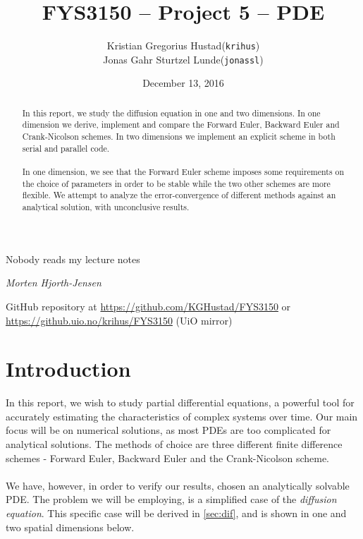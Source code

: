 \documentclass[10pt,a4paper]{article}
\begin{document}
\title{FYS3150 -- Project 5 -- PDE}
\author{
	\begin{tabular}{rl}
        Kristian Gregorius Hustad & (\texttt{krihus})\\
        Jonas Gahr Sturtzel Lunde & (\texttt{jonassl})
	\end{tabular}}
\date{December 13, 2016}
\maketitle



\setlength{\epigraphwidth}{0.75\textwidth}
\renewcommand{\epigraphflush}{center}
\renewcommand{\beforeepigraphskip}{50pt}
\renewcommand{\afterepigraphskip}{100pt}
\renewcommand{\epigraphsize}{\normalsize}
\epigraph{Nobody reads my lecture notes}
	{\textit{Morten Hjorth-Jensen}}

\begin{abstract}
\noindent
In this report, we study the diffusion equation in one and two dimensions. In one dimension we derive, implement and compare the Forward Euler, Backward Euler and Crank-Nicolson schemes. In two dimensions we implement an explicit scheme in both serial and parallel code.\\\\
In one dimension, we see that the Forward Euler scheme imposes some requirements on the choice of parameters in order to be stable while the two other schemes are more flexible. We attempt to analyze the error-convergence of different methods against an analytical solution, with unconclusive results.


\end{abstract}

\vfill


\begin{center}
    GitHub repository at \url{https://github.com/KGHustad/FYS3150}
    or \url{https://github.uio.no/krihus/FYS3150} (UiO mirror)
\end{center}


\pagebreak

\tableofcontents



\section{Introduction}
In this report, we wish to study partial differential equations, a powerful tool for accurately estimating the characteristics of complex systems over time. Our main focus will be on numerical solutions, as most PDEs are too complicated for analytical solutions. The methods of choice are three different finite difference schemes - Forward Euler, Backward Euler and the Crank-Nicolson scheme.
\\\\
We have, however, in order to verify our results, chosen an analytically solvable PDE. The problem we will be employing, is a simplified case of the \textit{diffusion equation}. This specific case will be derived in \vref{sec:dif}, and is shown in one and two spatial dimensions below.
\end{document}
